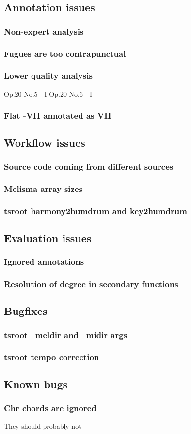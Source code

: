 	\subsection{Annotation issues}
		\subsubsection{Non-expert analysis}
		\subsubsection{Fugues are too contrapunctual}
		\subsubsection{Lower quality analysis}
		Op.20 No.5 - I
		Op.20 No.6 - I
		\subsubsection{Flat -VII annotated as VII}
	\subsection{Workflow issues}
		\subsubsection{Source code coming from different sources}
		\subsubsection{Melisma array sizes}
		\subsubsection{tsroot harmony2humdrum and key2humdrum}
	\subsection{Evaluation issues}
		\subsubsection{Ignored annotations}
		\subsubsection{Resolution of degree in secondary functions}
	\subsection{Bugfixes}
		\subsubsection{tsroot --meldir and --midir args}
		\subsubsection{tsroot tempo correction}
	\subsection{Known bugs}
		\subsubsection{Chr chords are ignored}
    They should probably not

\newpage
